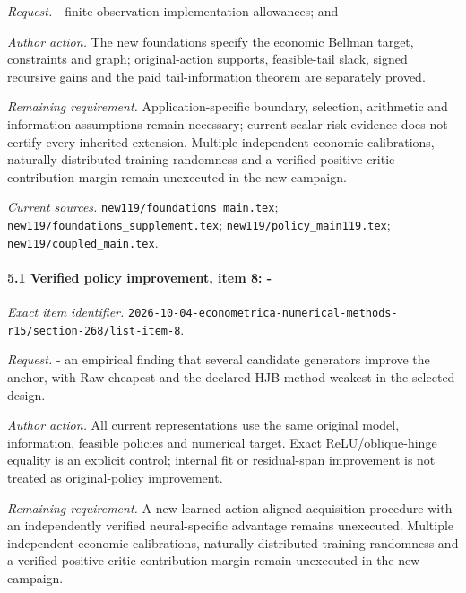 \par\emph{Request.} - finite-observation implementation allowances; and

\par\emph{Author action.} The new foundations specify the economic Bellman target, constraints and graph; original-action supports, feasible-tail slack, signed recursive gains and the paid tail-information theorem are separately proved.

\par\emph{Remaining requirement.} Application-specific boundary, selection, arithmetic and information assumptions remain necessary; current scalar-risk evidence does not certify every inherited extension. Multiple independent economic calibrations, naturally distributed training randomness and a verified positive critic-contribution margin remain unexecuted in the new campaign.

\par\emph{Current sources.} \nolinkurl{new119/foundations_main.tex}; \nolinkurl{new119/foundations_supplement.tex}; \nolinkurl{new119/policy_main119.tex}; \nolinkurl{new119/coupled_main.tex}.

\paragraph{5.1 Verified policy improvement, item 8: -}

\emph{Exact item identifier.} \nolinkurl{2026-10-04-econometrica-numerical-methods-r15/section-268/list-item-8}.

\par\emph{Request.} - an empirical finding that several candidate generators improve the anchor, with Raw cheapest and the declared HJB method weakest in the selected design.

\par\emph{Author action.} All current representations use the same original model, information, feasible policies and numerical target. Exact ReLU/\allowbreak{}oblique-hinge equality is an explicit control; internal fit or residual-span improvement is not treated as original-policy improvement.

\par\emph{Remaining requirement.} A new learned action-aligned acquisition procedure with an independently verified neural-specific advantage remains unexecuted. Multiple independent economic calibrations, naturally distributed training randomness and a verified positive critic-contribution margin remain unexecuted in the new campaign.

